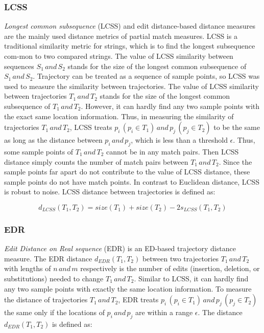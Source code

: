 \documentclass[a4paper, 12pt]{article}
\begin{document}
\subsubsection{LCSS}
\textit{Longest common subsequence} (LCSS) and edit distance-based distance measures are the mainly used distance metrics of partial match measures. LCSS is a traditional similarity metric for strings, which is to find the longest subsequence com-mon to two compared strings. The value of LCSS similarity between sequences $S_{1}\,and\,S_{2}$ stands for the size of the longest common subsequence of $S_{1}\,and\,S_{2}$. Trajectory can be treated as a sequence of sample points, so LCSS was used to measure the similarity between trajectories. The value of LCSS similarity between trajectories $T_{1}\,and\,T_{2}$ stands for the size of the longest common subsequence of $T_{1}\,and\,T_{2}$. However, it can hardly find any two sample points with the exact same location information. Thus, in measuring the similarity of trajectories $T_{1}\,and\,T_{2}$, LCSS treats $p_{i}\,(p_{i} \in T_{1})\,and\,p_{j}\,(p_{j} \in T_{2})$ to be the same as long as the distance between $p_{i}\,and\,p_{j}$, which is less than a threshold $\epsilon$. Thus, some sample points of $T_{1}\,and\,T_{2}$ cannot be in any match pairs. Then LCSS distance simply counts the number of match pairs between $T_{1}\,and\,T_{2}$. Since the sample points far apart do not contribute to the value of LCSS distance, these sample points do not have match points. In contrast to Euclidean distance, LCSS is robust to noise. LCSS distance between trajectories is defined as:

\begin{equation} \label{eq3}
    d_{LCSS}(T_{1}, T_{2}) = size(T_{1}) + size(T_{2}) - 2s_{LCSS}(T_{1},T_{2})
\end{equation}

\subsubsection{EDR}
\textit{Edit Distance on Real sequence} (EDR) is an ED-based trajectory distance measure. The EDR distance $d_{EDR}(T_{1},T_{2})$ between two trajectories $T_{1}\,and\,T_{2}$ with lengths of $n\,and\,m$ respectively is the number of edits (insertion, deletion, or substitutions) needed to change $T_{1}\,and\,T_{2}$. Similar to LCSS, it can hardly find any two sample points with exactly the same location information. To measure the distance of trajectories $T_{1}\,and\,T_{2}$, EDR treats $p_{i}\,(p_{i} \in T_{1})\,and\,p_{j}\,(p_{j} \in T_{2})$ the same only if the locations of $p_{i}\,and\,p_{j}$ are within a range $\epsilon$. The distance $d_{EDR}(T_{1},T_{2})$ is defined as:
\end{document}
